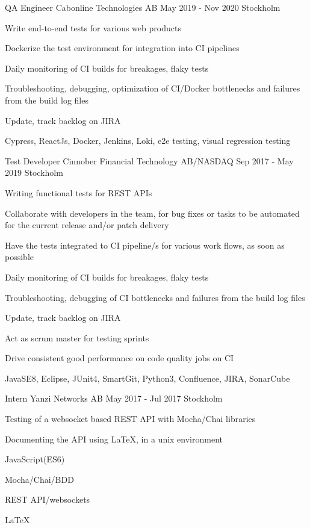 \documentclass[11pt, a4paper]{awesome-cv}
\begin{document}
\begin{cventries}
    \cventry
      {QA Engineer}
      {Cabonline Technologies AB}
      {May 2019 - Nov 2020}
      {Stockholm}
      {
        \begin{cvitems}
          \item Write end-to-end tests for various web products
          \item Dockerize the test environment for integration into CI pipelines
          \item Daily monitoring of CI builds for breakages, flaky tests
          \item Troubleshooting, debugging, optimization of CI/Docker bottlenecks and failures from the build log files
          \item Update, track backlog on JIRA
          \item Cypress, ReactJs, Docker, Jenkins, Loki, e2e testing, visual regression testing
        \end{cvitems}
      }

    \cventry
      {Test Developer}
      {Cinnober Financial Technology AB/NASDAQ}
      {Sep 2017 - May 2019}
      {Stockholm}
      {
        \begin{cvitems}
          \item Writing functional tests for REST APIs
          \item Collaborate with developers in the team, for bug fixes or tasks to be automated
          for the current release and/or patch delivery
          \item Have the tests integrated to CI pipeline/s for various work flows, as soon as possible
          \item Daily monitoring of CI builds for breakages, flaky tests
          \item Troubleshooting, debugging of CI bottlenecks and failures from the build log files
          \item Update, track backlog on JIRA
          \item Act as scrum master for testing sprints
          \item Drive consistent good performance on code quality jobs on CI
          \item JavaSE8, Eclipse, JUnit4, SmartGit, Python3, Confluence, JIRA, SonarCube
        \end{cvitems}
      }

    \cventry
      {Intern}
      {Yanzi Networks AB}
      {May 2017 - Jul 2017}
      {Stockholm}
      {
        \begin{cvitems}
          \item Testing of a websocket based REST API with Mocha/Chai libraries
          \item Documenting the API using LaTeX, in a unix environment
          \item JavaScript(ES6)
          \item Mocha/Chai/BDD
          \item REST API/websockets
          \item LaTeX
          \end{cvitems}
      }



\end{cventries}
\end{document}
